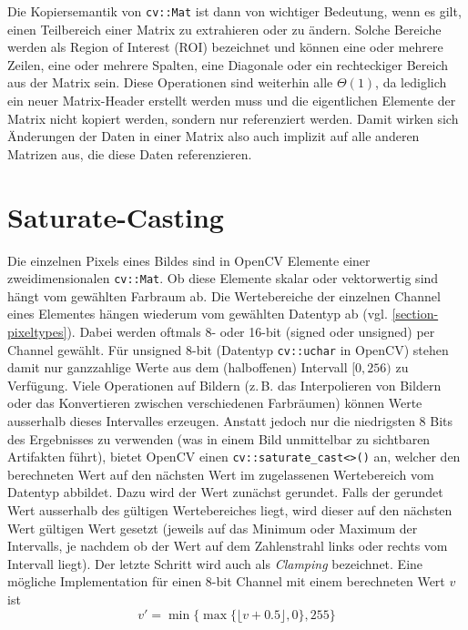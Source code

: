 \documentclass{whswinvcbook}
\begin{document}
Die Kopiersemantik von \texttt{cv::Mat} ist dann von wichtiger Bedeutung, wenn es gilt, einen Teilbereich einer Matrix zu extrahieren oder zu ändern. Solche Bereiche werden als Region of Interest (ROI) bezeichnet und können eine oder mehrere Zeilen, eine oder mehrere Spalten, eine Diagonale oder ein rechteckiger Bereich aus der Matrix sein.\cite{opencv2} Diese Operationen sind weiterhin alle $\Theta(1)$, da lediglich ein neuer Matrix-Header erstellt werden muss und die eigentlichen Elemente der Matrix nicht kopiert werden, sondern nur referenziert werden. Damit wirken sich Änderungen der Daten in einer Matrix also auch implizit auf alle anderen Matrizen aus, die diese Daten referenzieren.

\section{Saturate-Casting}\label{section-sat}
Die einzelnen Pixels eines Bildes sind in OpenCV Elemente einer zweidimensionalen \texttt{cv::Mat}. Ob diese Elemente skalar oder vektorwertig sind hängt vom gewählten Farbraum ab. Die Wertebereiche der einzelnen Channel eines Elementes hängen wiederum vom gewählten Datentyp ab (vgl. \ref{section-pixeltypes}). Dabei werden oftmals 8- oder 16-bit (signed oder unsigned) per Channel gewählt. Für unsigned 8-bit (Datentyp \texttt{cv::uchar} in OpenCV) stehen damit nur ganzzahlige Werte aus dem (halboffenen) Intervall $[0, 256)$ zu Verfügung. Viele Operationen auf Bildern (z.\,B. das Interpolieren von Bildern oder das Konvertieren zwischen verschiedenen Farbräumen) können Werte ausserhalb dieses Intervalles erzeugen. Anstatt jedoch nur die niedrigsten 8 Bits des Ergebnisses zu verwenden (was in einem Bild unmittelbar zu sichtbaren Artifakten führt), bietet OpenCV einen \texttt{cv::saturate\_cast<>()} an, welcher den berechneten Wert auf den nächsten Wert im zugelassenen Wertebereich vom Datentyp abbildet. Dazu wird der Wert zunächst gerundet. Falls der gerundet Wert ausserhalb des gültigen Wertebereiches liegt, wird dieser auf den nächsten Wert gültigen Wert gesetzt (jeweils auf das Minimum oder Maximum der Intervalls, je nachdem ob der Wert auf dem Zahlenstrahl links oder rechts vom Intervall liegt). Der letzte Schritt wird auch als \textit{Clamping} bezeichnet. Eine mögliche Implementation\cite{opencv3} für einen 8-bit Channel mit einem berechneten Wert $v$ ist $$v'=\min\{\max\{\lfloor v+0.5\rfloor,0\},255\}$$
\end{document}
